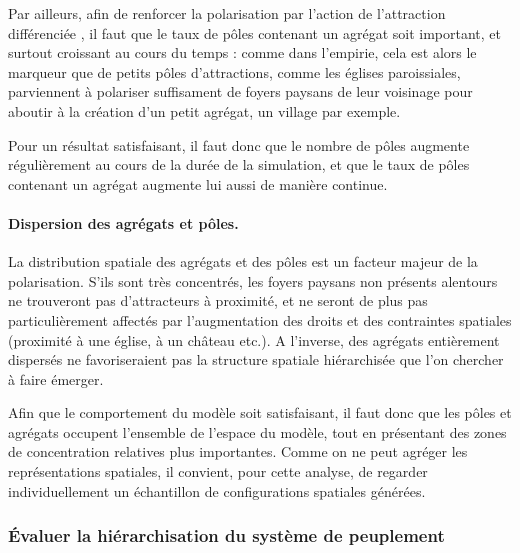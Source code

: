 Par ailleurs, afin de renforcer la polarisation par l'action de l'attraction différenciée
, il faut que le taux de pôles contenant un agrégat soit important, et surtout croissant au cours du temps :
comme dans l'empirie, cela est alors le marqueur que de petits pôles d'attractions, comme les églises paroissiales, parviennent à polariser suffisament de foyers paysans de leur voisinage pour aboutir à la création d'un petit agrégat, un village par exemple.

Pour un résultat satisfaisant, il faut donc que le nombre de pôles augmente régulièrement au cours de la durée de la simulation, et que le taux de pôles contenant un agrégat augmente lui aussi de manière continue.

\paragraph{Dispersion des agrégats et pôles.}\label{par:polarisation-dispersion}

La distribution spatiale des agrégats et des pôles est un facteur majeur de la polarisation.
S'ils sont très concentrés, les foyers paysans non présents alentours ne trouveront pas d'attracteurs à proximité, et ne seront de plus pas particulièrement affectés par l'augmentation des droits et des contraintes spatiales (proximité à une église, à un château etc.).
A l'inverse, des agrégats entièrement dispersés ne favoriseraient pas la structure spatiale hiérarchisée que l'on chercher à faire émerger.

Afin que le comportement du modèle soit satisfaisant, il faut donc que les pôles et agrégats occupent l'ensemble de l'espace du modèle, tout en présentant des zones de concentration relatives plus importantes.
Comme on ne peut agréger les représentations spatiales, il convient, pour cette analyse, de regarder individuellement un échantillon de configurations spatiales générées.

\subsubsection{Évaluer la hiérarchisation du système de peuplement}

